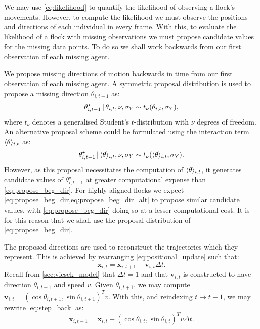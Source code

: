 We may use \cref{eq:likelihood} to quantify the likelihood of observing a
flock's movements. However, to compute the likelihood we must observe the
positions and directions of each individual in every frame. With this, to
evaluate the likelihood of a flock with missing observations we must propose
candidate values for the missing data points. To do so we shall work backwards
from our first observation of each missing agent.

We propose missing directions of motion backwards in time from our first
observation of each missing agent. A symmetric proposal distribution is used
to propose a missing direction $\theta_{i,t-1}$ as:
\begin{equation}
  \label{eq:propose_beg_dir}
  \theta_{i,t-1}^{\star} \,|\,  \theta_{i,t}, \nu, \sigma_Y
    \sim t_{\nu}(\theta_{i,t}, \sigma_Y),
\end{equation}
where $t_{\nu}$ denotes a generalised Student's $t$-distribution with $\nu$
degrees of freedom. An alternative proposal scheme could be formulated using
the interaction term $\langle\theta\rangle_{i,t}$ as:
\begin{equation}
  \label{eq:propose_beg_dir_alt}
  \theta_{i,t-1}^{\star} \,|\, \langle\theta\rangle_{i,t}, \nu, \sigma_Y
    \sim t_{\nu}(\langle\theta\rangle_{i,t}, \sigma_Y).
\end{equation}
However, as this proposal necessitates the computation of
$\langle\theta\rangle_{i,t}$, it generates candidate values of
$\theta_{i,t-1}^{\star}$ at greater computational expense than
\cref{eq:propose_beg_dir}. For highly aligned flocks we expect
\cref{eq:propose_beg_dir,eq:propose_beg_dir_alt} to propose similar candidate
values, with \cref{eq:propose_beg_dir} doing so at a lesser computational
cost. It is for this reason that we shall use the proposal distribution of
\cref{eq:propose_beg_dir}.

The proposed directions are used to reconstruct the trajectories which they
represent. This is achieved by rearranging \cref{eq:positional_update} such
that:
\begin{equation}
  \label{eq:step_back}
  \bm{x}_{i,t} = \bm{x}_{i,t+1} - \bm{v}_{i,t}\Delta t.
\end{equation}
Recall from \cref{sec:vicsek_model} that $\Delta t =1$ and that $\bm{v}_{i,t}$
is constructed to have direction $\theta_{i,t+1}$ and speed $v$. Given
$\theta_{i,t+1}$, we may compute $\bm{v}_{i,t} = (\cos\theta_{i,t+1},
\sin\theta_{i,t+1})^T v$. With this, and reindexing $t\mapsto t-1$, we may
rewrite \cref{eq:step_back} as:
\begin{equation}
  \label{eq:propose_beg_pos}
  \bm{x}_{i,t-1} = \bm{x}_{i,t} - (\cos\theta_{i,t}, \sin\theta_{i,t})^T
  v\Delta t.
\end{equation}

